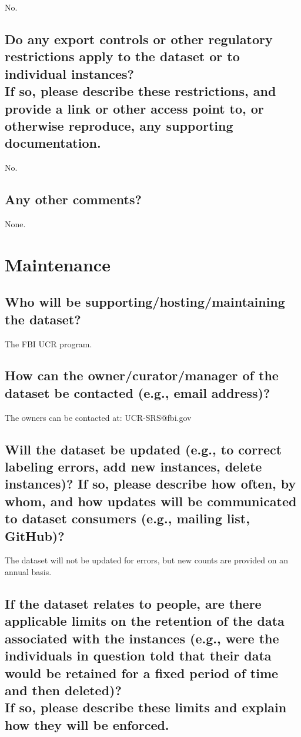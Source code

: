\documentclass[letterpaper, 10 pt, conference]{ieeeconf}  %
\newcommand{\subtitle}[1]{{\\ \small \normalfont \color{purple} #1}}
\begin{document}
No.

\subsection{Do any export controls or other regulatory restrictions apply to the dataset or to individual instances? \subtitle{If so, please describe these restrictions, and provide a link or other access point to, or otherwise reproduce, any supporting documentation.}}

No.

\subsection{Any other comments?}

None.

\section{Maintenance}

\subsection{Who will be supporting/hosting/maintaining the dataset?}

The FBI UCR program.

\subsection{How can the owner/curator/manager of the dataset be contacted (e.g., email address)?}

The owners can be contacted at: UCR-SRS@fbi.gov

\subsection{Will the dataset be updated (e.g., to correct labeling errors, add new instances, delete instances)? If so, please describe how often, by whom, and how updates will be communicated to dataset consumers (e.g., mailing list, GitHub)?}

The dataset will not be updated for errors, but new counts are provided on an annual basis.

\subsection{If the dataset relates to people, are there applicable limits on the retention of the data associated with the instances (e.g., were the individuals in question told that their data would be retained for a fixed period of time and then deleted)? \subtitle{If so, please describe these limits and explain how they will be enforced.}}
\end{document}
